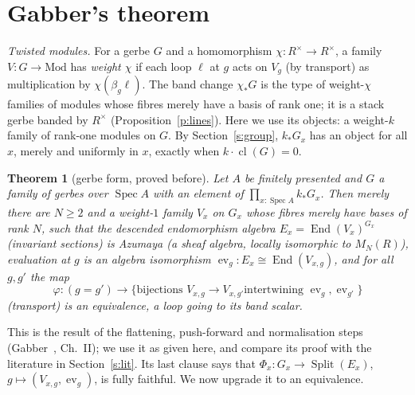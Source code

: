 \documentclass[11pt]{amsart}
\newtheorem{theorem}{Theorem}[section]
\theoremstyle{definition}
\theoremstyle{remark}
\newcommand{\Spec}{\operatorname{Spec}}
\newcommand{\End}{\operatorname{End}}
\newcommand{\Split}{\operatorname{Split}}
\newcommand{\cl}{\operatorname{cl}}
\newcommand{\ev}{\operatorname{ev}}
\newcommand{\Rx}{R^\times}
\newcommand{\Mat}{M_N(R)}
\begin{document}
\section{Gabber's theorem}\label{s:gabber}

\emph{Twisted modules.} For a gerbe $G$ and a homomorphism
$\chi:\Rx\to\Rx$, a family $V:G\to\mathrm{Mod}$ has \emph{weight $\chi$} if
each loop $\ell$ at $g$ acts on $V_g$ (by transport) as multiplication by
$\chi(\beta_g\ell)$. The band change $\chi_*G$ is the type of weight-$\chi$
families of modules whose fibres merely have a basis of rank one; it is a
stack gerbe banded by $\Rx$ (Proposition~\ref{p:lines}). Here we use its
objects: a weight-$k$ family of rank-one modules on $G$. By
Section~\ref{s:group}, $k_*G_x$ has an object for all $x$, merely and
uniformly in $x$, exactly when $k\cdot\cl(G)=0$.

\begin{theorem}[gerbe form, proved before]\label{t:gerbe}
Let $A$ be finitely presented and $G$ a family of gerbes over $\Spec A$
with an element of $\prod_{x:\Spec A}k_*G_x$. Then merely there are $N\geq2$
and a weight-$1$ family $V_x$ on $G_x$ whose fibres merely have bases of
rank $N$, such that the descended endomorphism algebra
$E_x=\End(V_x)^{G_x}$ (invariant sections) is Azumaya (a sheaf algebra,
locally isomorphic to $\Mat$), evaluation at $g$ is an algebra isomorphism
$\ev_g:E_x\cong\End(V_{x,g})$, and for all $g,g'$ the map
\[\varphi:(g=g')\to\{\text{bijections } V_{x,g}\to V_{x,g'}\text{
intertwining }\ev_g,\ev_{g'}\}\]
(transport) is an equivalence, a loop going to its band scalar.
\end{theorem}

This is the result of the flattening, push-forward and normalisation steps
(Gabber~\cite{Gabber}, Ch.~II); we use it as given here, and compare its
proof with the literature in Section~\ref{s:lit}. Its last clause says that
$\Phi_x:G_x\to\Split(E_x)$, $g\mapsto(V_{x,g},\ev_g)$, is fully faithful. We
now upgrade it to an equivalence.
\end{document}
